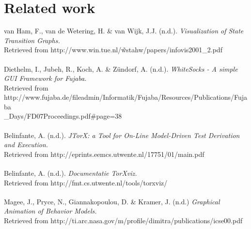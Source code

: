 \documentclass[11pt,a4paper]{article}
\begin{document}

\section{Related work}
van Ham, F., van de Wetering, H. \& van Wijk, J.J. (n.d.). \textit{Visualization of State Transition Graphs.}\\
Retrieved from http://www.win.tue.nl/\~wstahw/papers/infovis2001\_2.pdf
\\\\
Diethelm, I., Jubeh, R., Koch, A. \& Zündorf, A. (n.d.). \textit{WhiteSocks - A simple GUI Framework for Fujaba.}\\ Retrieved from http://www.fujaba.de/fileadmin/Informatik/Fujaba/Resources/Publications/Fujaba\\\_Days/FD07Proceedings.pdf\#page=38
\\\\
Belinfante, A. (n.d.). \textit{JTorX: a Tool for On-Line Model-Driven Test Derivation and Execution.} \\Retrieved from http://eprints.eemcs.utwente.nl/17751/01/main.pdf
\\\\
Belinfante, A. (n.d.). \textit{Documentatie TorXviz.}\\ Retrieved from http://fmt.cs.utwente.nl/tools/torxviz/
\\\\
Magee, J., Pryce, N., Giannakopoulou, D. \& Kramer, J. (n.d.) \textit{Graphical Animation of Behavior Models.}\\ Retrieved from http://ti.arc.nasa.gov/m/profile/dimitra/publications/icse00.pdf 
\end{document}
